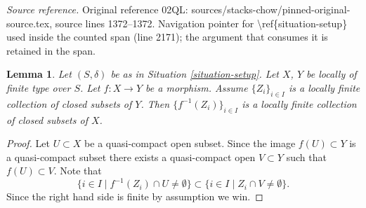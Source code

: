 \documentclass[10pt,a4paper]{amsart}
\theoremstyle{plain}
\newtheorem{lemma}[subsection]{Lemma}
\theoremstyle{definition}
\theoremstyle{remark}
\numberwithin{equation}{subsection}
\begin{document}
\noindent\textit{Source reference.} Original reference 02QL: sources/stacks-chow/pinned-original-source.tex, source lines 1372--1372. Navigation pointer for \textbackslash{}ref\{situation-setup\} used inside the counted span (line 2171); the argument that consumes it is retained in the span.\par\medskip
\begin{lemma}
\label{lemma-inverse-image-locally-finite}
Let $(S, \delta)$ be as in Situation \ref{situation-setup}.
Let $X$, $Y$ be locally of finite type over $S$.
Let $f : X \to Y$ be a morphism.
Assume $\{Z_i\}_{i \in I}$ is a locally
finite collection of closed subsets of $Y$.
Then $\{f^{-1}(Z_i)\}_{i \in I}$ is a locally finite
collection of closed subsets of $X$.
\end{lemma}

\begin{proof}
Let $U \subset X$ be a quasi-compact open subset.
Since the image $f(U) \subset Y$ is a quasi-compact subset
there exists a quasi-compact open $V \subset Y$ such that
$f(U) \subset V$. Note that
$$
\{i \in I \mid f^{-1}(Z_i) \cap U \not = \emptyset \}
\subset
\{i \in I \mid Z_i \cap V \not = \emptyset \}.
$$
Since the right hand side is finite by assumption we win.
\end{proof}
\end{document}
